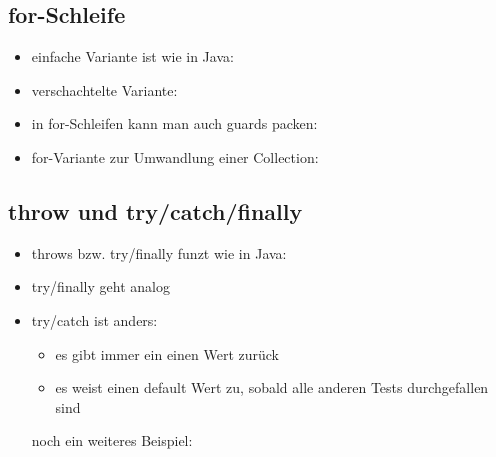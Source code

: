 \subsection{for-Schleife}
\begin{itemize}
  \item einfache Variante ist wie in Java:
  
  
  
  \item verschachtelte Variante:
  
  
  
  \item in for-Schleifen kann man auch guards packen:
  
  
  
  \item for-Variante zur Umwandlung einer Collection:
  
  
\end{itemize}


\subsection{throw und try/catch/finally}
\begin{itemize}
  \item throws bzw. try/finally funzt wie in Java:
  
  
  
  \item try/finally geht analog
  \item try/catch ist anders:
  \begin{itemize}
    \item es gibt immer ein einen Wert zurück
    \item es weist einen default Wert zu, sobald alle anderen Tests
    durchgefallen sind
    
        
  \end{itemize}
  
  noch ein weiteres Beispiel:
  
\end{itemize}



